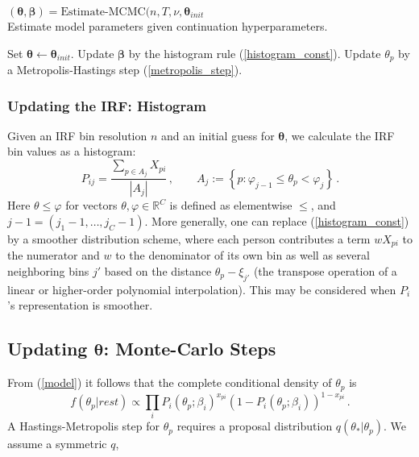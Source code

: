 \documentclass{article}
\newcommand{\R}{\mathbb{R}}
\newcommand{\ta}{\theta}
\newcommand{\bbeta}{\boldsymbol\beta}
\newcommand{\bta}{\boldsymbol\ta}
\newcommand{\lla}{\longleftarrow}
\begin{document}
\begin{algorithm}
\caption[]{$(\bta, \bbeta) = {\mbox{Estimate-MCMC}}(n, T, \nu, \bta_{init}$\\\hspace{\textwidth}
Estimate model parameters given continuation hyperparameters.}
\label{mcmc}
\begin{algorithmic}
    \STATE Set $\bta \lla \bta_{init}$.
    	\STATE Update $\bbeta$ by the histogram rule (\ref{histogram_const}).
	    		\STATE Update $\theta_p$ by a Metropolis-Hastings step (\ref{metropolis_step}).
	    	\ENDFOR
    	\ENDFOR
    \ENDWHILE
\end{algorithmic}
\end{algorithm}

\subsubsection{Updating the IRF: Histogram}
\label{histogram}
Given an IRF bin resolution $n$ and an initial guess for $\bta$, we calculate the IRF bin values as a histogram:
\begin{equation}
	\label{histogram_const}
	P_{ij} = \frac{\sum_{p \in A_j} X_{pi}}{|A_j|}\,,\qquad
	A_j := \left\{ p : \varphi_{j-1} \leq \ta_p < \varphi_j \right\}\,.
\end{equation}
Here $\ta \leq \varphi$ for vectors $\ta,\varphi \in \R^C$ is defined as elementwise $\leq$, and $j-1 = (j_1-1,\dots,j_C-1)$.
More generally, one can replace (\ref{histogram_const}) by a smoother distribution scheme, where each person contributes a term $w X_{pi}$ to the numerator and $w$ to the denominator of its own bin as well as several neighboring bins $j'$ based on the distance $\theta_p - \xi_{j'}$ (the transpose operation of a linear or higher-order polynomial interpolation). This may be considered when $P_i$'s representation is smoother.

\subsection{Updating $\bta$: Monte-Carlo Steps}
\label{metropolis}
From (\ref{model}) it follows that the complete conditional density of $\ta_p$ is
\begin{equation}
  f(\ta_p|rest) \propto \prod_i 
  P_i(\ta_p;\beta_i)^{x_{pi}}\left(1 - P_i(\ta_p;\beta_i)\right)^{1-x_{pi}}\,.
  \label{cond_ta}
\end{equation}
A Hastings-Metropolis step for $\ta_p$ requires a proposal distribution $q(\ta_*|\ta_p)$. We assume a symmetric $q$, 
\end{document}
